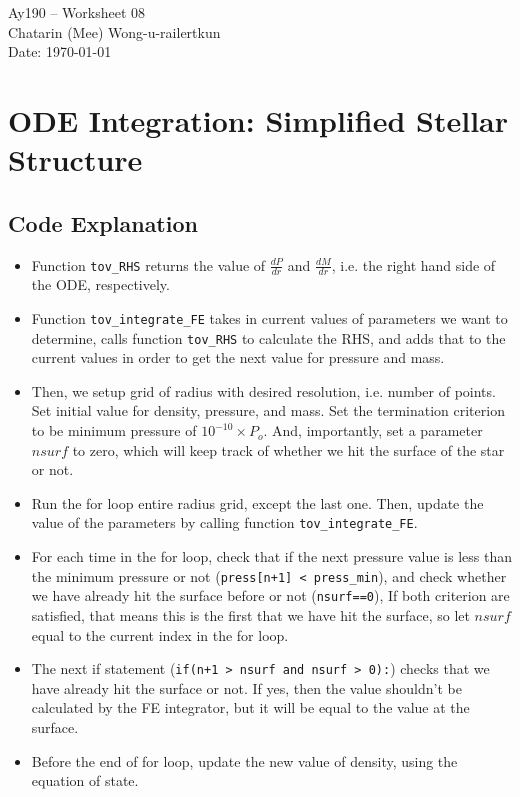 \documentclass[11pt,letterpaper]{article}
\begin{document}
\begin{center}
\Large
Ay190 -- Worksheet 08 \\    %
Chatarin (Mee) Wong-u-railertkun\\
Date: \today
\end{center}

\section{ODE Integration: Simplified Stellar Structure}

\subsection{Code Explanation}

\begin{itemize}

	\item Function \texttt{tov\_RHS} returns the value of $\frac{dP}{dr}$ and $\frac{dM}{dr}$, i.e. the right hand side of the ODE, respectively.
	
	\item Function \texttt{tov\_integrate\_FE} takes in current values of parameters we want to determine, calls function \texttt{tov\_RHS} to calculate the RHS, and adds that to the current values in order to get the next value for pressure and mass.
	
	\item Then, we setup grid of radius with desired resolution, i.e. number of points. Set initial value for density, pressure, and mass. Set the termination criterion to be minimum pressure of $10^{-10} \times P_o$. And, importantly, set a parameter $nsurf$ to zero, which will keep track of whether we hit the surface of the star or not.
	
	\item Run the for loop entire radius grid, except the last one. Then, update the value of the parameters by calling function \texttt{tov\_integrate\_FE}.
	
	\item For each time in the for loop, check that if the next pressure value is less than the minimum pressure or not (\texttt{press[n+1] < press\_min}), and check whether we have already hit the surface before or not (\texttt{nsurf==0}), If both criterion are satisfied, that means this is the first that we have hit the surface, so let $nsurf$ equal to the current index in the for loop.
	
	\item The next if statement (\texttt{if(n+1 > nsurf and nsurf > 0):}) checks that we have already hit the surface or not. If yes, then the value shouldn't be calculated by the FE integrator, but it will be equal to the value at the surface.

	\item Before the end of for loop, update the new value of density, using the equation of state. 

\end{itemize}
\end{document}
